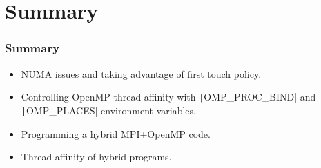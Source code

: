 \documentclass{beamer}
\begin{document}
\section{Summary}
\begin{frame}
\frametitle{Summary}

\begin{itemize}
  \item NUMA issues and taking advantage of first touch policy.
  \item Controlling OpenMP thread affinity with \texttt|OMP_PROC_BIND| and \texttt|OMP_PLACES| environment variables.
  \item Programming a hybrid MPI+OpenMP code.
  \item Thread affinity of hybrid programs.
\end{itemize}

%

\end{frame}

\end{document}
